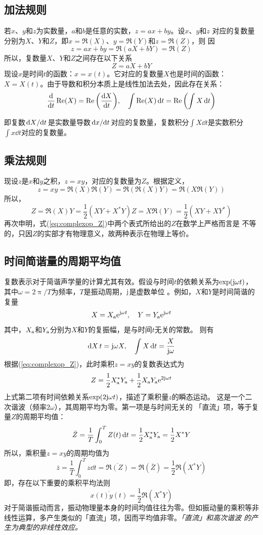 \documentclass[UTF8]{ctexbook}
\begin{document}
\subsection{加法规则}
若$x$、$y$和$z$为实数量，$a$和$b$是任意的实数，$z=ax+by$。设$x$、$y$和$z$
对应的复数量分别为$X$、$Y$和$Z$，即$x=\Re(X)$、$y=\Re(Y)$和$z=\Re(Z)$，则
因
$$
z = ax+by = \Re(aX+bY) = \Re(Z)
$$
所以，复数量$X$、$Y$和$Z$之间存在以下关系
$$Z=aX+bY$$
现设$x$是时间$t$的函数：$x=x(t)$。它对应的复数量$X$也是时间的函数：$X=
X(t)$。由于导数和积分本质上是线性加法去处，因此存在关系：
$$\dv{t} \Re(X) =\Re\qty(\dv{X}{t})\qc \int \Re(X) \dd{t} = \Re 
\qty(\int X\dd{t})$$

即复数$\dv*{X}{t}$是实数量导数$\dv*{x}{t}$对应的复数量，复数积分$\int X
\dd{t}$是实数积分$\int x\dd{t}$对应的复数量。

\subsection{乘法规则}
现设$z$是$x$和$y$之积，$z=xy$，对应的复数量为$Z$。根据定义，
$$z=xy =\Re(X)\Re(Y) = \Re(\Re(X)Y)=\Re(X\Re(Y))$$
所以，
\begin{subequations}
	\label{eq:complexop_Z}
	\begin{equation}Z= \Re(X)Y = \frac12 (XY+X^*Y)\end{equation}
	\begin{equation}Z=X\Re(Y) = \frac12 (XY+XY^*)\end{equation}
\end{subequations}
再次申明，式(\ref{eq:complexop_Z})中两个表式所给出的$Z$在数学上严格而言是
不等的，只因$Z$的实部才有物理意义，故两种表示在物理上等价。

\subsection{时间简谐量的周期平均值}
复数表示对于简谐声学量的计算尤其有效。假设与时间$t$的依赖关系为$\exp(\mathrm{j} 
\omega t)$，其中$\omega = 2\uppi /T$为频率，$T$是振动周期，$\mathrm{j}$是虚数单位
。例如，$X$和$Y$是时间简谐的复量
$$X=X\st{a} \me^{\mj \omega t }\qc Y = Y\st{a}\me^{\mj \omega t}$$
其中，$X_\text{a}$和$Y_\text{a}$分别为$X$和$Y$的复振幅，是与时间$t$无关的常数。
则有
$$\dd{X}{t}=\mj \omega X\qc \int X\dd{t} = \frac{X}{\mj \omega}$$
根据(\ref{eq:complexop_Z})，此时乘积$z=xy$的复数表达式为
$$Z=\frac12 X_\text{a}^* Y_\text{a}+\frac12 X_\text{a}Y_\text{a}\mathrm{e}^{2\mathrm{j} \omega t}$$
上式第二项有时间依赖关系$\exp(2\mathrm{j} \omega  t)$，描述了乘积量$z$的瞬态运动。
这是一个二次谐波（频率$2\omega$），其周期平均为零。第一项是与时间无关的
「直流」项，等于复量$Z$的周期平均值：
$$\bar{Z} = \frac1T \int_0^T Z(t) \dd{t} = \frac12 X_\text{a}^* Y_\text{a} =
\frac12 X^* Y$$
所以，乘积量$z=xy$的周期均值为
$$\bar{z}=\frac1T \int_0^T z\dd{t} = \overline{\Re(Z)} = \Re(\bar{Z})
=\frac12\Re(X^*Y)$$
即，存在以下重要的乘积平均法则
\begin{equation}
	\overline{x(t)y(t)} = \frac12 \Re(X^*Y) \label{eq:complexop_xy}
\end{equation}
对于简谐振动而言，振动物理量本身的时间均值往往为零。但如振动量的乘积等非
线性运算，多产生类似的「直流」项，因而平均值非零。\emph{「直流」和高次谐波
的产生为典型的非线性效应。}
\end{document}
